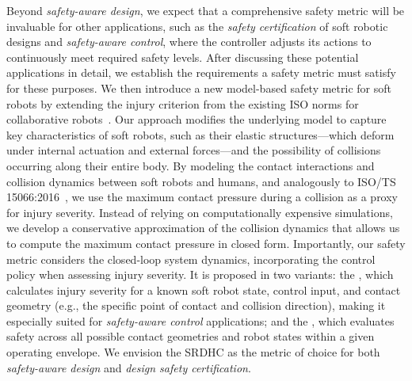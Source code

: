 Beyond \emph{safety-aware design}, we expect that a comprehensive safety metric will be invaluable for other applications, such as the \emph{safety certification} of soft robotic designs and \emph{safety-aware control}, where the controller adjusts its actions to continuously meet required safety levels. After discussing these potential applications in detail, we establish the requirements a safety metric must satisfy for these purposes. We then introduce a new model-based safety metric for soft robots by extending the injury criterion from the existing ISO norms for collaborative robots~\citep{iso2016collaborative}. Our approach modifies the underlying model to capture key characteristics of soft robots, such as their elastic structures—which deform under internal actuation and external forces—and the possibility of collisions occurring along their entire body. By modeling the contact interactions and collision dynamics between soft robots and humans, and analogously to ISO/TS 15066:2016~\citep{iso2016collaborative}, we use the maximum contact pressure during a collision as a proxy for injury severity. Instead of relying on computationally expensive simulations, we develop a conservative approximation of the collision dynamics that allows us to compute the maximum contact pressure in closed form. Importantly, our safety metric considers the closed-loop system dynamics, incorporating the control policy when assessing injury severity. It is proposed in two variants: the , which calculates injury severity for a known soft robot state, control input, and contact geometry (e.g., the specific point of contact and collision direction), making it especially suited for \emph{safety-aware control} applications; and the , which evaluates safety across all possible contact geometries and robot states within a given operating envelope. We envision the \gls{SRDHC} as the metric of choice for both \emph{safety-aware design} and \emph{design safety certification}.